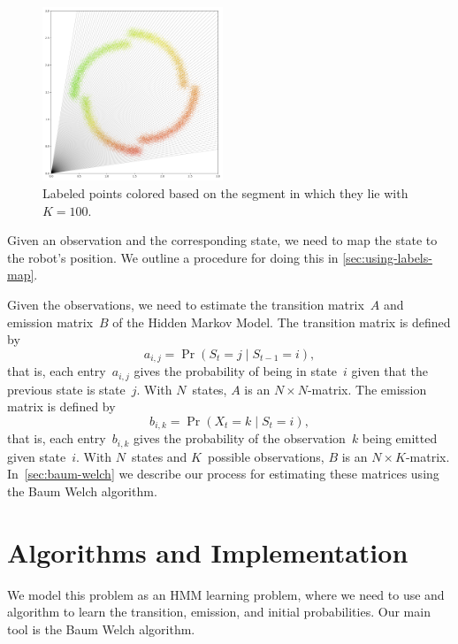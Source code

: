 \documentclass[twoside]{article}
\begin{document}
\begin{figure}
  \begin{center}
    \includegraphics[width=0.48\textwidth]{images/angle-discrete}
    \caption{Labeled points colored based on the segment in which they lie with~${K = 100}$.}
  \end{center}
\end{figure}

Given an observation and the corresponding state, we need to map the state to the robot's position.
We outline a procedure for doing this in \cref{sec:using-labels-map}.

Given the observations, we need to estimate the transition matrix~$A$ and emission matrix~$B$ of the Hidden Markov Model.
The transition matrix is defined by
\begin{equation*}
  a_{i,j} = \Pr(S_{t} = j \mid S_{t-1} = i),
\end{equation*}
that is, each entry~$a_{i, j}$ gives the probability of being in state~$i$ given that the previous state is state~$j$.
With $N$~states, $A$ is an ${N \times N}$-matrix.
The emission matrix is defined by
\begin{equation*}
  b_{i, k} = \Pr(X_t = k \mid S_t = i),
\end{equation*}
that is, each entry~$b_{i, k}$ gives the probability of the observation~$k$ being emitted given state~$i$.
With $N$~states and $K$~possible observations, $B$ is an ${N \times K}$-matrix.
In~\cref{sec:baum-welch} we describe our process for estimating these matrices using the Baum Welch algorithm.

\section{Algorithms and Implementation}\label{sec:algo-and-impl}

We model this problem as an HMM learning problem, where we need to use and algorithm to learn the transition, emission, and initial probabilities.
Our main tool is the Baum Welch algorithm.
\end{document}
